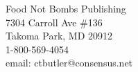 \begin{flushleft}
Food Not Bombs Publishing\\
7304 Carroll Ave \#136\\
Takoma Park, MD 20912\\
1-800-569-4054\\
email: ctbutler@consensus.net
\end{flushleft}